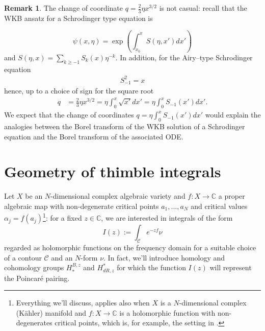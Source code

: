 \documentclass{article}
\theoremstyle{definition}
\newcommand{\C}{\mathbb{C}}
\newtheorem{remark}[definition]{Remark}
\theoremstyle{plain}
\begin{document}
\begin{remark}
The change of coordinate $q=\frac{2}{3}\eta x^{3/2}$ is not casual: recall that the WKB ansatz for a Schrodinger type equation is

\begin{equation}
\psi(x,\eta)=\exp\left(\int_{x_0}^xS(\eta,x')dx'\right)
\end{equation} 
 and $S(\eta,x)=\sum_{k\geq -1}S_k(x)\eta^{-k}$. In addition, for the Airy--type Schrodinger equation 
 \begin{align*}
 S_{-1}^2=x
 \end{align*}
hence, up to a choice of sign for the square root
\begin{align*}
q&=\frac{2}{3}\eta x^{3/2}=\eta\int_0^x\sqrt{x'}dx'=\eta\int_{0}^xS_{-1}(x')dx'.
\end{align*}
We expect that the change of coordinates $q=\eta\int_0^{x}S_{-1}(x')dx'$ would explain the analogies between the Borel transform of the WKB solution of a Schrodinger equation and the Borel transform of the associated ODE.  
\end{remark} 

\section{Geometry of thimble integrals}\label{apx:geometry_thimble_integrals}

Let $X$ be an $N$-dimensional complex algebraic variety and $f\colon X\to\C$ a proper algebraic map with non-degenerate critical points $a_1,...,a_N$ and critical values $\alpha_j=f(a_j)$\footnote{Everything we’ll discuss, applies also when $X$ is a $N$-dimensional complex (K\"ahler) manifold and $f\colon X\to\C$ is a holomorphic function with non-degenerates critical points, which is, for example, the setting in \cite{Witten}.}: for a fixed $z\in\C$, we are interested in integrals of the form 
\[
I(z):=\int_{\mathcal{C}}e^{-zf}\nu
\]
regarded as holomorphic functions on the frequency domain for a suitable choice of a contour $\mathcal{C}$ and an $N$-form $\nu$. In fact, we'll introduce homology and cohomology groups $H_{*}^{B,z}$ and $H_{dR,z}^*$ for which the function $I(z)$ will represent the Poincar\'e pairing. 
\end{document}
